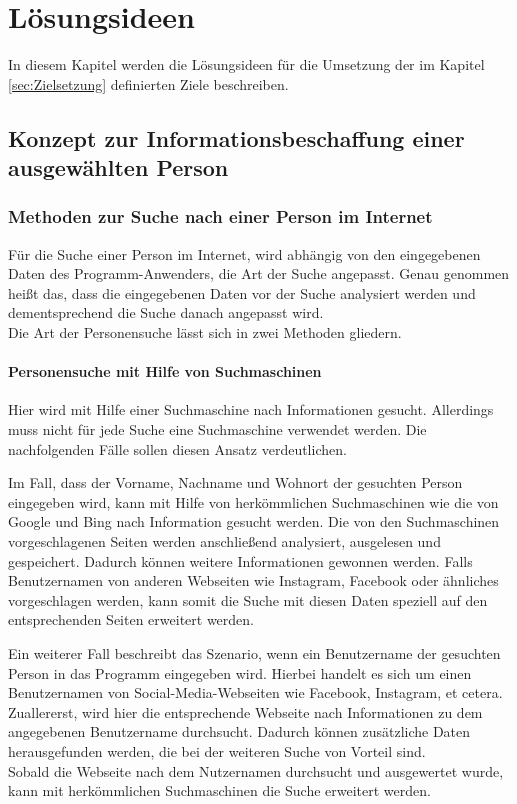 
\chapter{Lösungsideen}  %
\label{cha:Lösungsideen} %
In diesem Kapitel werden die Lösungsideen für die Umsetzung der im Kapitel \ref{sec:Zielsetzung} definierten Ziele beschreiben.

\section{Konzept zur Informationsbeschaffung einer ausgewählten Person}	
	\subsection{Methoden zur Suche nach einer Person im Internet}
	\label{sec:Suche nach Information}
	Für die Suche einer Person im Internet, wird abhängig von den eingegebenen Daten des Programm-Anwenders, die Art der Suche angepasst. Genau genommen heißt das, dass die eingegebenen Daten vor der Suche analysiert werden und dementsprechend die Suche danach angepasst wird. \\
	Die Art der Personensuche lässt sich in zwei Methoden gliedern.
		\subsubsection{Personensuche mit Hilfe von Suchmaschinen}
		\label{subsubsec:PersonensucheMitHilfevonSuchmaschine}
		Hier wird mit Hilfe einer Suchmaschine nach Informationen gesucht. Allerdings muss nicht für jede Suche eine Suchmaschine verwendet werden. Die nachfolgenden Fälle sollen diesen Ansatz verdeutlichen.
		
		Im Fall, dass der Vorname, Nachname und Wohnort der gesuchten Person eingegeben wird, kann mit Hilfe von herkömmlichen Suchmaschinen wie die von Google und Bing nach Information gesucht werden. Die von den Suchmaschinen vorgeschlagenen Seiten werden anschließend analysiert, ausgelesen und gespeichert. Dadurch können weitere Informationen gewonnen werden. Falls Benutzernamen von anderen Webseiten wie Instagram, Facebook oder ähnliches vorgeschlagen werden, kann somit die Suche mit diesen Daten speziell auf den entsprechenden Seiten erweitert werden.
		
		Ein weiterer Fall beschreibt das Szenario, wenn ein Benutzername der gesuchten Person in das Programm eingegeben wird. Hierbei handelt es sich um einen Benutzernamen von Social-Media-Webseiten wie Facebook, Instagram, et cetera. \\
		Zuallererst, wird hier die entsprechende Webseite nach Informationen zu dem angegebenen Benutzername durchsucht. Dadurch können zusätzliche Daten herausgefunden werden, die bei der weiteren Suche von Vorteil sind.\\
		Sobald die Webseite nach dem Nutzernamen durchsucht und ausgewertet wurde, kann mit herkömmlichen Suchmaschinen die Suche erweitert werden.
		
